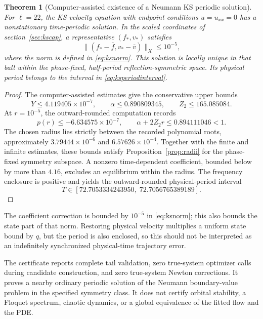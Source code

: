 \documentclass[11pt]{article}
\newtheorem{theorem}[proposition]{Theorem}
\begin{document}
\begin{samepage}
\begin{theorem}[Computer-assisted existence of a Neumann KS periodic solution]
\label{thm:ksorbit}
For $\ell=22$, the KS velocity equation with endpoint conditions $u=u_{xx}=0$ has a nonstationary time-periodic solution. In the scaled coordinates of section~\ref{sec:kscap}, a representative $(f_*,v_*)$ satisfies
\begin{equation}
 \|(f_*-\bar f,v_*-\bar v)\|_X\leq10^{-5},
\end{equation}
where the norm is defined in \eqref{eq:ksnorm}. This solution is locally unique in that ball within the phase-fixed, half-period reflection-symmetric space. Its physical period belongs to the interval in \eqref{eq:ksperiodinterval}.
\end{theorem}
\end{samepage}
\begin{proof}
The computer-assisted estimates give the conservative upper bounds
\begin{equation}
 Y\leq4.119405\times10^{-7},\qquad
 \alpha\leq0.890809345,\qquad
 Z_2\leq165.085084.
 \label{eq:ksbounds}
\end{equation}
At $r=10^{-5}$, the outward-rounded computation records
\begin{equation}
 p(r)\leq-6.634575\times10^{-7},\qquad
 \alpha+2Z_2r\leq0.894111046<1.
\end{equation}
The chosen radius lies strictly between the recorded polynomial roots, approximately $3.79444\times10^{-6}$ and $6.57626\times10^{-4}$. Together with the finite and infinite estimates, these bounds satisfy Proposition~\ref{prop:radii} for the phase-fixed symmetry subspace. A nonzero time-dependent coefficient, bounded below by more than $4.16$, excludes an equilibrium within the radius. The frequency enclosure is positive and yields the outward-rounded physical-period interval
\begin{equation}
 T\in[72.7053334243950,\;72.7056765389189].
 \label{eq:ksperiodinterval}
\end{equation}
\end{proof}
The coefficient correction is bounded by $10^{-5}$ in \eqref{eq:ksnorm}; this also bounds the state part of that norm. Restoring physical velocity multiplies a uniform state bound by $q$, but the period is also enclosed, so this should not be interpreted as an indefinitely synchronized physical-time trajectory error.

The certificate reports complete tail validation, zero true-system optimizer calls during candidate construction, and zero true-system Newton corrections. It proves a nearby ordinary periodic solution of the Neumann boundary-value problem in the specified symmetry class. It does not certify orbital stability, a Floquet spectrum, chaotic dynamics, or a global equivalence of the fitted flow and the PDE. 
\end{document}
